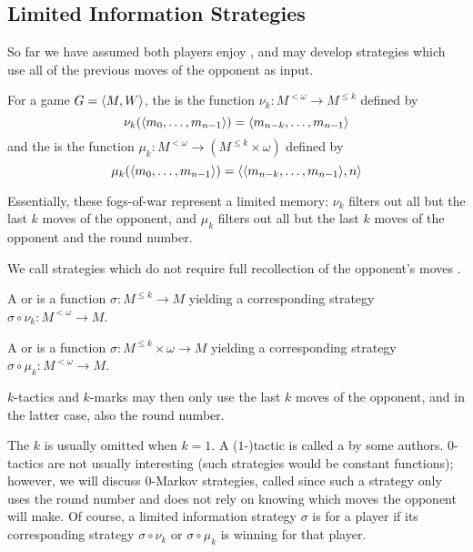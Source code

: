\subsection{Limited Information Strategies}

So far we have assumed both players enjoy , and
may develop strategies which use all of the previous moves of the opponent
as input.

\begin{defn}
  For a game $G=\langle M,W\rangle$, the  is the function
  $\nu_k:M^{<\omega}\to M^{\leq k}$ defined by
    \[
      \nu_k(\langle m_0,\dots,m_{n-1}\rangle)=\langle m_{n-k},\dots,m_{n-1}\rangle
    \]
  and the  is the function
  $\mu_k:M^{<\omega}\to (M^{\leq k}\times\omega)$ defined by
    \[
      \mu_k(\langle m_0,\dots,m_{n-1}\rangle)=\langle\langle m_{n-k},\dots,m_{n-1}\rangle,n\rangle
    \]
\end{defn}

Essentially, these fogs-of-war represent a limited memory: $\nu_k$ filters out
all but the last $k$ moves of the opponent, and $\mu_k$ filters out all but
the last $k$ moves of the opponent and the round number.

We call strategies which do not require full recollection of the opponent's
moves .

\begin{defn}
  A  or  is a function
  $\sigma:M^{\leq k}\to M$ yielding a corresponding strategy
  $\sigma\circ\nu_k:M^{<\omega}\to M$.

  A  or  is a function
  $\sigma:M^{\leq k}\times\omega\to M$ yielding a corresponding strategy
  $\sigma\circ\mu_k:M^{<\omega}\to M$.
\end{defn}

$k$-tactics and $k$-marks may then only use the last $k$ moves of the opponent,
and in the latter case, also the round number.

The $k$ is usually omitted when $k=1$. A ($1$-)tactic is
called a  by some authors. $0$-tactics are not
usually interesting (such strategies would be constant functions); however,
we will discuss $0$-Markov strategies, called
 since such a strategy only uses the round
number and does not rely on knowing which moves the opponent will make.
Of course, a limited information strategy $\sigma$ is  for a
player if its corresponding strategy $\sigma\circ\nu_k$ or $\sigma\circ\mu_k$
is winning for that player.

